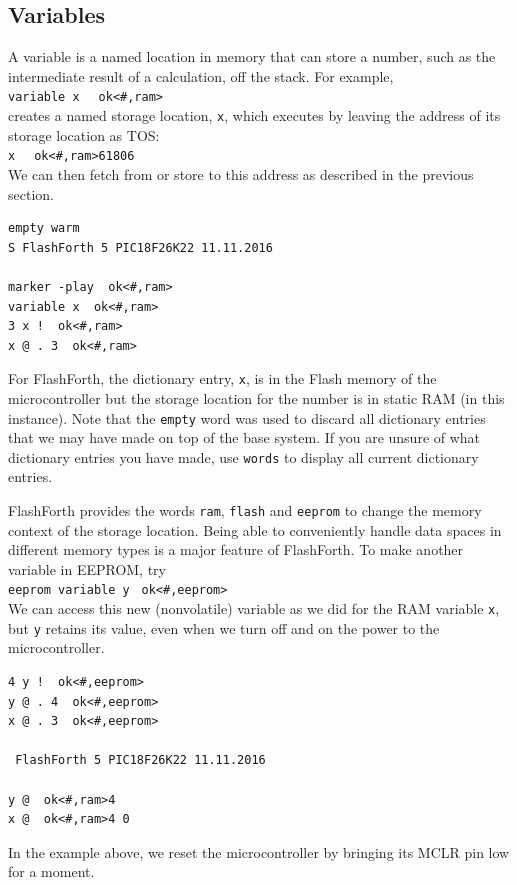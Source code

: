\documentclass[12pt,a4paper]{article}
\begin{document}
\subsection{Variables}
\label{sec:variables}
%
A variable is a named location in memory that can store a number,
such as the intermediate result of a calculation, off the stack.
For example, \vspace{7pt} \\
\verb?variable x ? \fbox{$\hookleftarrow$} \verb! ok<#,ram>! \vspace{7pt} \\
creates a named storage location, \verb!x!, which executes by leaving the address
of its storage location as TOS: \vspace{7pt} \\
\verb?x ? \fbox{$\hookleftarrow$} \verb! ok<#,ram>61806! \vspace{7pt} \\
We can then fetch from or store to this address as described in the previous section.
\begin{verbatim}
empty warm 
S FlashForth 5 PIC18F26K22 11.11.2016

marker -play  ok<#,ram>
variable x  ok<#,ram>
3 x !  ok<#,ram>
x @ . 3  ok<#,ram>
\end{verbatim}
For FlashForth, the dictionary entry, \verb!x!, 
is in the Flash memory of the microcontroller but the
storage location for the number is in static RAM (in this instance).
Note that the \verb!empty! word was used to discard all dictionary entries that
we may have made on top of the base system.
If you are unsure of what dictionary entries you have made, 
use \verb!words! to display all current dictionary entries.

\medskip
FlashForth provides the words \verb!ram!, \verb!flash! and \verb!eeprom!
to change the memory context of the storage location.
Being able to conveniently handle data spaces in different
memory types is a major feature of FlashForth.
To make another variable in EEPROM, try \vspace{7pt} \\
\verb?eeprom variable y? \fbox{$\hookleftarrow$} \verb! ok<#,eeprom>! \vspace{7pt} \\
We can access this new (nonvolatile) variable as we did for the RAM variable \verb!x!,
but \verb!y! retains its value, even when we turn off and on the power to the microcontroller.
\begin{verbatim}
4 y !  ok<#,eeprom>
y @ . 4  ok<#,eeprom>
x @ . 3  ok<#,eeprom>

 FlashForth 5 PIC18F26K22 11.11.2016

y @  ok<#,ram>4 
x @  ok<#,ram>4 0 
\end{verbatim}
In the example above, we reset the microcontroller by bringing its MCLR pin low for a moment.
\end{document}
